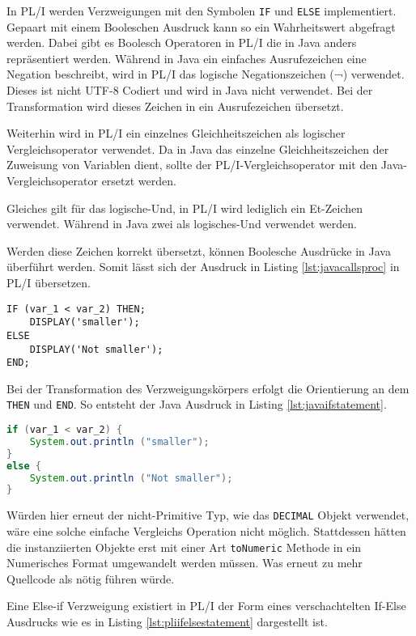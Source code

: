 In PL/I werden Verzweigungen mit den Symbolen \verb+IF+ und \verb+ELSE+ implementiert. 
Gepaart mit einem Booleschen Ausdruck kann so ein Wahrheitswert abgefragt werden.
Dabei gibt es Boolesch Operatoren in PL/I die in Java anders repräsentiert werden.
Während in Java ein einfaches Ausrufezeichen eine Negation beschreibt, wird in PL/I das logische Negationszeichen (¬) verwendet. Dieses ist nicht UTF-8 Codiert und wird in Java nicht verwendet. Bei der Transformation wird dieses Zeichen in ein Ausrufezeichen übersetzt.

Weiterhin wird in PL/I ein einzelnes Gleichheitszeichen als logischer Vergleichsoperator verwendet. Da in Java das einzelne Gleichheitszeichen der Zuweisung von Variablen dient, sollte der PL/I-Vergleichsoperator mit den Java-Vergleichsoperator ersetzt werden.

Gleiches gilt für das logische-Und, in PL/I wird lediglich ein Et-Zeichen verwendet. Während in Java zwei als logisches-Und verwendet werden.

Werden diese Zeichen korrekt übersetzt, können Boolesche Ausdrücke in Java überführt werden.
Somit lässt sich der Ausdruck in Listing \ref{lst:javacallsproc} in PL/I übersetzen.

\begin{lstlisting}[language=PL/I, caption=PL/I if-statements, label={lst:javacallsproc}]
IF (var_1 < var_2) THEN;
	DISPLAY('smaller');
ELSE
	DISPLAY('Not smaller');
END;
\end{lstlisting} 

Bei der Transformation des Verzweigungskörpers erfolgt die Orientierung an dem \verb+THEN+ und \verb+END+.
So entsteht der Java Ausdruck in Listing \ref{lst:javaifstatement}.

\begin{lstlisting}[language=Java, caption=Java if-statements, label={lst:javaifstatement}]
if (var_1 < var_2) {
	System.out.println ("smaller");
}
else {
	System.out.println ("Not smaller");
}
\end{lstlisting} 

Würden hier erneut der nicht-Primitive Typ, wie das \verb+DECIMAL+ Objekt verwendet, wäre eine solche einfache Vergleichs Operation nicht möglich.
Stattdessen hätten die instanziierten Objekte erst mit einer Art \verb+toNumeric+ Methode in ein Numerisches Format umgewandelt werden müssen.
Was erneut zu mehr Quellcode als nötig führen würde.

Eine Else-if Verzweigung existiert in PL/I der Form eines verschachtelten If-Else Ausdrucks wie es in Listing \ref{lst:pliifelsestatement} dargestellt ist.

